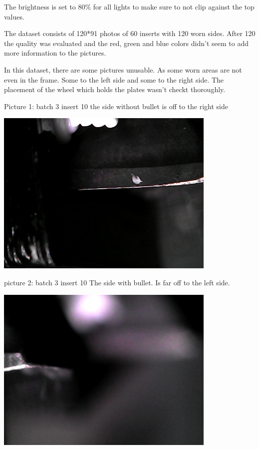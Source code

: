 \documentclass{article}
\begin{document}
The brightness is set to 80\% for all lights to make sure to not clip against the top values.



The dataset consists of 120*91 photos of 60 inserts with 120 worn sides. After 120 the quality was evaluated and the red, green and blue colors didn't seem to add more information to the pictures. 



In this dataset, there are some pictures unusable. As some worn areas are not even in the frame. Some to the left side and some to the right side. The placement of the wheel which holds the plates wasn't checkt thoroughly.

Picture 1: batch 3 insert 10 the side without bullet is off to the right side 

\includegraphics[width=4.166667in, keepaspectratio=true]{./ZimFiles_files/Vision/Dataset/automated_datasets/2_created_datasets/1_Birthday_dataset/b_003_p_010_l_000_nb.png}

picture 2: batch 3 insert 10 The side with bullet. Is far off to the left side.

\includegraphics[width=4.166667in, keepaspectratio=true]{./ZimFiles_files/Vision/Dataset/automated_datasets/2_created_datasets/1_Birthday_dataset/b_003_p_010_l_000_b.png}
\end{document}
